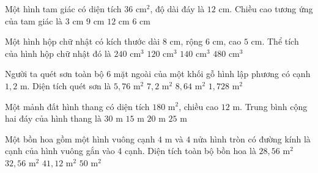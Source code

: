 \begin{ex} %
Một hình tam giác có diện tích $36\text{ cm}^2$, độ dài đáy là $12\text{ cm}$. Chiều cao tương ứng của tam giác là
\choice
{$3\text{ cm}$}
{$9\text{ cm}$}
{$12\text{ cm}$}
{\True $6\text{ cm}$}
\end{ex}

\begin{ex} %
Một hình hộp chữ nhật có kích thước dài $8\text{ cm}$, rộng $6\text{ cm}$, cao $5\text{ cm}$. Thể tích của hình hộp chữ nhật đó là
\choice
{\True $240\text{ cm}^3$}
{$120\text{ cm}^3$}
{$140\text{ cm}^3$}
{$480\text{ cm}^3$}
\end{ex}

\begin{ex} %
Người ta quét sơn toàn bộ $6$ mặt ngoài của một khối gỗ hình lập phương có cạnh $1{,}2\text{ m}$. Diện tích quét sơn là
\choice
{$5{,}76\text{ m}^2$}
{$7{,}2\text{ m}^2$}
{\True $8{,}64\text{ m}^2$}
{$1{,}728\text{ m}^2$}
\end{ex}

\begin{ex} %
Một mảnh đất hình thang có diện tích $180\text{ m}^2$, chiều cao $12\text{ m}$. Trung bình cộng hai đáy của hình thang là
\choice
{$30\text{ m}$}
{\True $15\text{ m}$}
{$20\text{ m}$}
{$25\text{ m}$}
\end{ex}

\begin{ex} %
Một bồn hoa gồm một hình vuông cạnh $4\text{ m}$ và $4$ nửa hình tròn có đường kính là cạnh của hình vuông gắn vào 4 cạnh. Diện tích toàn bộ bồn hoa là
\choice
{$28{,}56\text{ m}^2$}
{$32{,}56\text{ m}^2$}
{\True $41{,}12\text{ m}^2$}
{$50\text{ m}^2$}
\end{ex}

